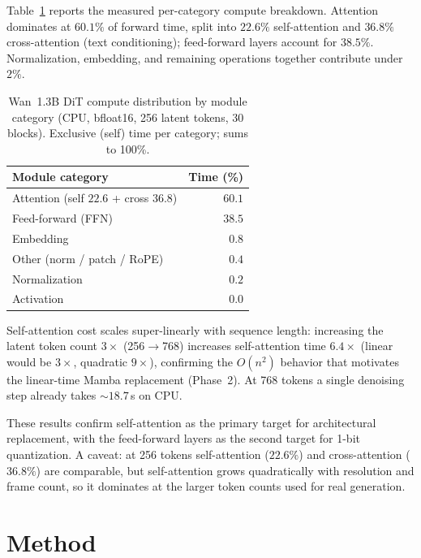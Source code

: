 \documentclass[11pt]{article}
\begin{document}
Table~\ref{tab:profile} reports the measured per-category compute breakdown.
Attention dominates at $60.1\%$ of forward time, split into $22.6\%$
self-attention and $36.8\%$ cross-attention (text conditioning); feed-forward
layers account for $38.5\%$. Normalization, embedding, and remaining operations
together contribute under $2\%$.

\begin{table}[h]
\centering
\caption{Wan~1.3B DiT compute distribution by module category (CPU, bfloat16,
256 latent tokens, 30 blocks). Exclusive (self) time per category; sums to 100\%.}
\label{tab:profile}
\begin{tabular}{@{}lr@{}}
\toprule
Module category & Time (\%) \\
\midrule
Attention (self $22.6$ + cross $36.8$) & $60.1$ \\
Feed-forward (FFN) & $38.5$ \\
Embedding & $0.8$ \\
Other (norm / patch / RoPE) & $0.4$ \\
Normalization & $0.2$ \\
Activation & $0.0$ \\
\bottomrule
\end{tabular}
\end{table}

Self-attention cost scales super-linearly with sequence length: increasing the
latent token count $3\times$ (256$\to$768) increases self-attention time
$6.4\times$ (linear would be $3\times$, quadratic $9\times$), confirming the
$O(n^2)$ behavior that motivates the linear-time Mamba replacement (Phase~2).
At 768 tokens a single denoising step already takes ${\sim}18.7$\,s on CPU.

These results confirm self-attention as the primary target for architectural
replacement, with the feed-forward layers as the second target for 1-bit
quantization. A caveat: at 256 tokens self-attention ($22.6\%$) and cross-attention
($36.8\%$) are comparable, but self-attention grows quadratically with resolution
and frame count, so it dominates at the larger token counts used for real
generation.


\section{Method}
\end{document}
